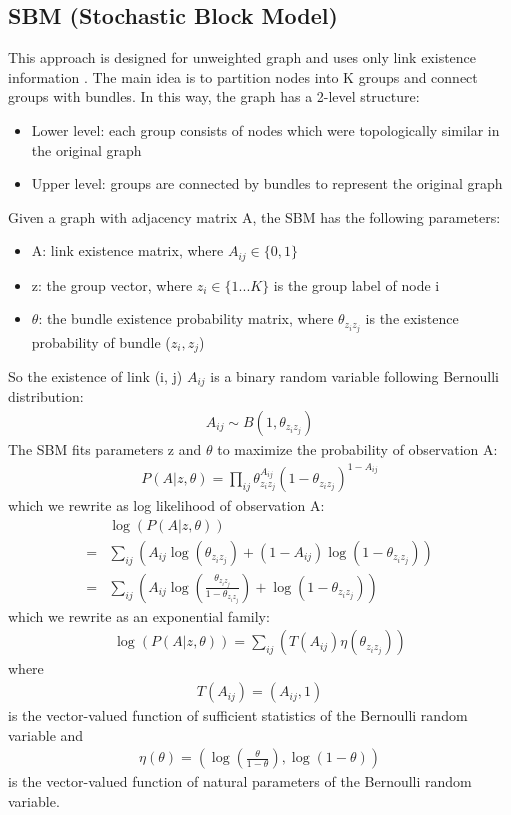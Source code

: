 \documentclass[conference]{IEEEtran}
\begin{document}
\subsection{SBM (Stochastic Block Model)}
This approach is designed for unweighted graph and uses only link existence information \cite{holland1983stochastic}.
The main idea is to partition nodes into K groups and connect groups with bundles.
In this way, the graph has a 2-level structure:
\begin{itemize}
	\item Lower level: each group consists of nodes which were topologically similar in the original graph
	\item Upper level: groups are connected by bundles
	to represent the original graph
\end{itemize}
Given a graph with adjacency matrix A, the SBM has the following parameters:
\begin{itemize}
	\item A: link existence matrix, where $ A_{ij} \in \{0, 1\} $
	\item z: the group vector,
	where $ z_i \in \{ 1 ... K \} $ is the group label of node i
	\item $ \theta $: the bundle existence probability matrix,
	where $ \theta_{z_i z_j} $ is the existence probability of bundle ($z_i, z_j$)
\end{itemize}
So the existence of link (i, j) $ A_{ij} $ is a binary random variable following Bernoulli distribution:
\begin{align*}
	A_{ij} \sim B(1, \theta_{z_i z_j})
\end{align*}
The SBM fits parameters z and $ \theta $
to maximize the probability of observation A:
\begin{align*}
	P(A|z, \theta) 
	= \prod_{ij} \theta_{z_i z_j}^{A_{ij}}(1-\theta_{z_i z_j})^{1-A_{ij}}
\end{align*}
which we rewrite as log likelihood of observation A:
\begin{align*}
	&\log(P(A|z, \theta))\\
	=& \sum_{ij} (
	{A_{ij}} \log (\theta_{z_i z_j})
	+ (1 - {A_{ij}}) \log(1-\theta_{z_i z_j})
	)\\
	=& \sum_{ij} (
	{A_{ij}} \log (\frac{\theta_{z_i z_j}}{1-\theta_{z_i z_j}})
	+ \log(1-\theta_{z_i z_j})
	)
\end{align*}
which we rewrite as an exponential family:
\begin{align*}
	\log(P(A|z, \theta))
	= \sum_{ij} (
	T(A_{ij}) \eta(\theta_{z_i z_j})
	)
\end{align*}
where
\begin{align*}
	T(A_{ij}) = (A_{ij}, 1)
\end{align*}
is the vector-valued function of sufficient statistics of the Bernoulli random variable and
\begin{align*}
\eta(\theta) = ( \log(\frac{\theta}{1-\theta}), \log(1-\theta) )
\end{align*}
is the vector-valued function of natural parameters of the Bernoulli random variable.
\end{document}
